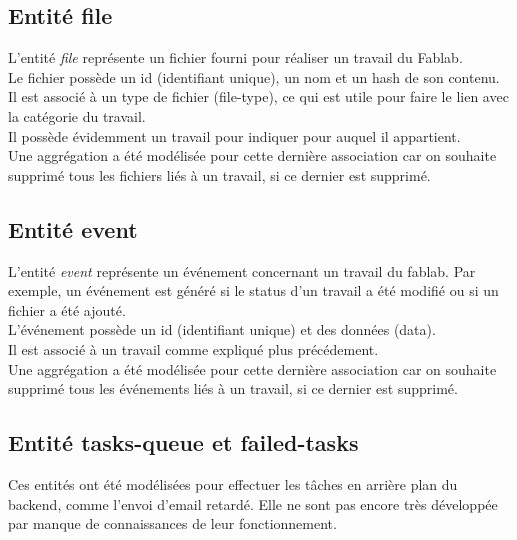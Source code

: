 \documentclass[
    iai, %
    il, %
]{heig-tb}
\begin{document}
\subsection{Entité file}
L'entité \emph{file} représente un fichier fourni pour réaliser un travail du Fablab.\\
Le fichier possède un id (identifiant unique), un nom et un hash de son contenu.\\
Il est associé à un type de fichier (file-type), ce qui est utile pour faire le lien avec la catégorie du travail.\\
Il possède évidemment un travail pour indiquer pour auquel il appartient.\\
Une aggrégation a été modélisée pour cette dernière association car on souhaite supprimé tous les fichiers liés à un travail, si ce dernier est supprimé.

\subsection{Entité event}
L'entité \emph{event} représente un événement concernant un travail du fablab. Par exemple, un événement est généré si le status d'un travail a été modifié ou si un fichier a été ajouté. \\
L'événement possède un id (identifiant unique) et des données (data).\\
Il est associé à un travail comme expliqué plus précédement.\\
Une aggrégation a été modélisée pour cette dernière association car on souhaite supprimé tous les événements liés à un travail, si ce dernier est supprimé.

\subsection{Entité tasks-queue et failed-tasks}
Ces entités ont été modélisées pour effectuer les tâches en arrière plan du backend, comme l'envoi d'email retardé. Elle ne sont pas encore très développée par manque de connaissances de leur fonctionnement.
\end{document}
